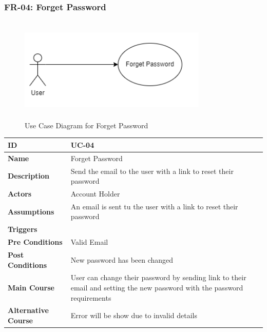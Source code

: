    \subsubsection{FR-04: Forget Password}
    \begin{figure}[H]
        \includegraphics[height=5cm, width=0.8\textwidth]{./diagrams/Use Case/u4.png}
        \centering 
        \caption{Use Case Diagram for Forget Password}
        \label{fig: Usecase1}
        \end{figure}
        
    \begin{center}
        \begin{tabularx}{\textwidth}{|l|X|}
            \hline
            \textbf{ID} & UC-04 \\
            \hline
            \textbf{Name} & Forget Password \\
            \hline
            \textbf{Description} & Send the email to the user with a link to reset their password \\
            \hline
            \textbf{Actors} & Account Holder \\
            \hline
            \textbf{Assumptions} & An email is sent tu the user with a link to reset their password \\
            \hline
            \textbf{Triggers} &  \\
            \hline
            \textbf{Pre Conditions} & Valid Email \\
            \hline
            \textbf{Post Conditions} & New password has been changed \\
            \hline
            \textbf{Main Course} & User can change their password by sending link to their email and setting the new password with the password requirements \\
            \hline
            \textbf{Alternative Course} & Error will be show due to invalid details \\
            \hline
            
        \end{tabularx}
    \end{center}
    \newpage
    

